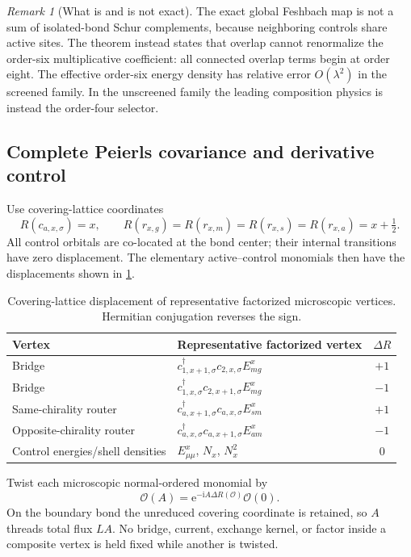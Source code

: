 \documentclass[11pt]{article}
\theoremstyle{definition}
\theoremstyle{remark}
\newtheorem{remark}[theorem]{Remark}
\newcommand{\I}{\mathrm i}
\newcommand{\e}{\mathrm e}
\begin{document}
\begin{remark}[What is and is not exact]
The exact global Feshbach map is not a sum of isolated-bond Schur complements, because neighboring controls share active sites.  The theorem instead states that overlap cannot renormalize the order-six multiplicative coefficient: all connected overlap terms begin at order eight.  The effective order-six energy density has relative error $O(\lambda^2)$ in the screened family.  In the unscreened family the leading composition physics is instead the order-four selector.
\end{remark}

\subsection{Complete Peierls covariance and derivative control}

Use covering-lattice coordinates
\begin{equation}
 R(c_{a,x,\sigma})=x,
 \qquad
 R(r_{x,g})=R(r_{x,m})=R(r_{x,s})=R(r_{x,a})=x+\tfrac12.
 \label{eq:position-assignment}
\end{equation}
All control orbitals are co-located at the bond center; their internal transitions have zero displacement.  The elementary active--control monomials then have the displacements shown in \cref{tab:displacements}.

\begin{table}[H]
\centering
\caption{Covering-lattice displacement of representative factorized microscopic vertices.  Hermitian conjugation reverses the sign.}
\label{tab:displacements}
\begin{tabular}{@{}llc@{}}
\toprule
Vertex & Representative factorized vertex & $\Delta R$\\
\midrule
Bridge & $c_{1,x+1,\sigma}^\dagger c_{2,x,\sigma}E^x_{mg}$ & $+1$\\
Bridge & $c_{1,x,\sigma}^\dagger c_{2,x+1,\sigma}E^x_{mg}$ & $-1$\\
Same-chirality router & $c_{a,x+1,\sigma}^\dagger c_{a,x,\sigma}E^x_{sm}$ & $+1$\\
Opposite-chirality router & $c_{a,x,\sigma}^\dagger c_{a,x+1,\sigma}E^x_{am}$ & $-1$\\
Control energies/shell densities & $E^x_{\mu\mu}$, $N_x$, $N_x^2$ & $0$\\
\bottomrule
\end{tabular}
\end{table}

Twist each microscopic normal-ordered monomial by
\begin{equation}
 \mathcal O(A)=\e^{-\I A\Delta R(\mathcal O)}\mathcal O(0).
 \label{eq:peierls-monomial}
\end{equation}
On the boundary bond the unreduced covering coordinate is retained, so $A$ threads total flux $LA$.  No bridge, current, exchange kernel, or factor inside a composite vertex is held fixed while another is twisted.
\end{document}
